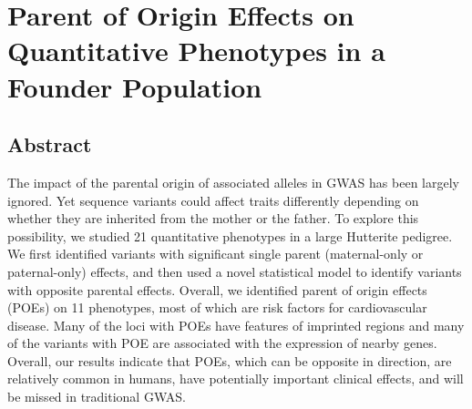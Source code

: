 \chapter{Parent of Origin Effects on Quantitative Phenotypes in a Founder Population}\label{ch:pogwas}
\section[Abstract]{Abstract\footnotemark}


The impact of the parental origin of associated alleles in GWAS has been largely ignored. Yet sequence variants could affect traits differently depending on whether they are inherited from the mother or the father. To explore this possibility, we studied 21 quantitative phenotypes in a large Hutterite pedigree. We first identified variants with significant single parent (maternal-only or paternal-only) effects, and then used a novel statistical model to identify variants with opposite parental effects. Overall, we identified parent of origin effects (POEs) on 11 phenotypes, most of which are risk factors for cardiovascular disease. Many of the loci with POEs have features of imprinted regions and many of the variants with POE are associated with the expression of nearby genes. Overall, our results indicate that POEs, which can be opposite in direction, are relatively common in humans, have potentially important clinical effects, and will be missed in traditional GWAS. 



